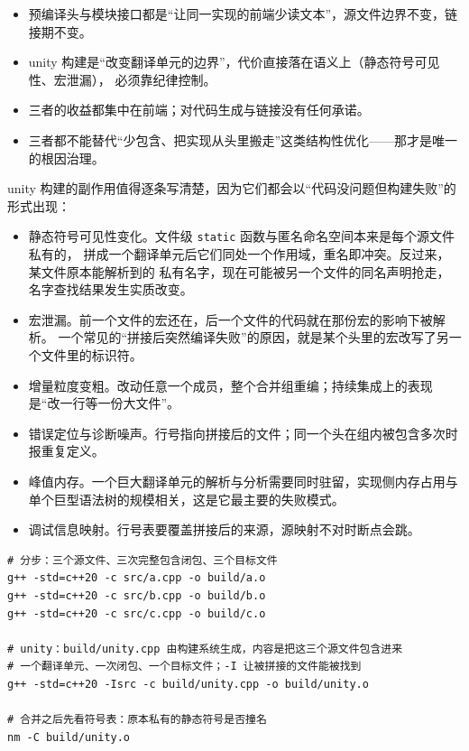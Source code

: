 \documentclass[12pt,a4paper,fontset=fandol]{ctexbook}
\newcommand{\Tp}[1]{\texttt{#1}}
\begin{document}
\begin{compare}[title={缓存解析结果与改变输入形状}]
\begin{itemize}
  \item 预编译头与模块接口都是“让同一实现的前端少读文本”，源文件边界不变，链接期不变。
  \item unity 构建是“改变翻译单元的边界”，代价直接落在语义上（静态符号可见性、宏泄漏），
    必须靠纪律控制。
  \item 三者的收益都集中在前端；对代码生成与链接没有任何承诺。
  \item 三者都不能替代“少包含、把实现从头里搬走”这类结构性优化——那才是唯一的根因治理。
\end{itemize}
\end{compare}

unity 构建的副作用值得逐条写清楚，因为它们都会以“代码没问题但构建失败”的形式出现：

\begin{itemize}
  \item 静态符号可见性变化。文件级 \Tp{static} 函数与匿名命名空间本来是每个源文件私有的，
    拼成一个翻译单元后它们同处一个作用域，重名即冲突。反过来，某文件原本能解析到的
    私有名字，现在可能被另一个文件的同名声明抢走，名字查找结果发生实质改变。
  \item 宏泄漏。前一个文件的宏还在，后一个文件的代码就在那份宏的影响下被解析。
    一个常见的“拼接后突然编译失败”的原因，就是某个头里的宏改写了另一个文件里的标识符。
  \item 增量粒度变粗。改动任意一个成员，整个合并组重编；持续集成上的表现是“改一行等一份大文件”。
  \item 错误定位与诊断噪声。行号指向拼接后的文件；同一个头在组内被包含多次时报重复定义。
  \item 峰值内存。一个巨大翻译单元的解析与分析需要同时驻留，实现侧内存占用与
    单个巨型语法树的规模相关，这是它最主要的失败模式。
  \item 调试信息映射。行号表要覆盖拼接后的来源，源映射不对时断点会跳。
\end{itemize}

\begin{lstlisting}[style=shellstyle,language=ShellCL,caption={unity 与分步的命令形状（示意，只用来观察代价）}]
# 分步：三个源文件、三次完整包含闭包、三个目标文件
g++ -std=c++20 -c src/a.cpp -o build/a.o
g++ -std=c++20 -c src/b.cpp -o build/b.o
g++ -std=c++20 -c src/c.cpp -o build/c.o

# unity：build/unity.cpp 由构建系统生成，内容是把这三个源文件包含进来
# 一个翻译单元、一次闭包、一个目标文件；-I 让被拼接的文件能被找到
g++ -std=c++20 -Isrc -c build/unity.cpp -o build/unity.o

# 合并之后先看符号表：原本私有的静态符号是否撞名
nm -C build/unity.o
\end{lstlisting}
\end{document}
